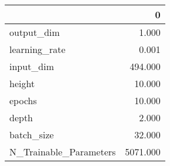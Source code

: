 \begin{tabular}{lr}
\toprule
{} &         0 \\
\midrule
output\_dim             &     1.000 \\
learning\_rate          &     0.001 \\
input\_dim              &   494.000 \\
height                 &    10.000 \\
epochs                 &    10.000 \\
depth                  &     2.000 \\
batch\_size             &    32.000 \\
N\_Trainable\_Parameters &  5071.000 \\
\bottomrule
\end{tabular}
